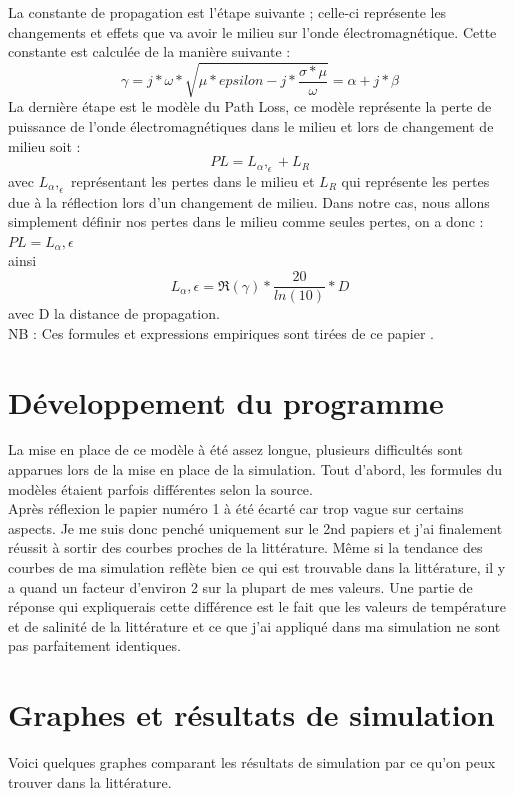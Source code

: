 \documentclass{article}
\begin{document}
La constante de propagation est l'étape suivante ; celle-ci représente les changements et effets que va avoir le milieu sur l'onde électromagnétique. Cette constante est calculée de la manière suivante :
\[\gamma = j*\omega*\sqrt{\mu*epsilon - j*\frac{\sigma*\mu}{\omega}} = \alpha + j* \beta\]
La dernière étape est le modèle du Path Loss, ce modèle représente la perte de puissance de l'onde électromagnétiques dans le milieu et lors de changement de milieu soit :
\[PL = L_\alpha,_\epsilon + L_R\]
avec \(L_\alpha,_\epsilon\) représentant les pertes dans le milieu et \(L_R\) qui représente les pertes due à la réflection lors d'un changement de milieu. Dans notre cas, nous allons simplement définir nos pertes dans le milieu comme seules pertes, on a donc :
\(PL = L_\alpha,\epsilon\)\\
ainsi
\[L_\alpha,\epsilon = \Re{(\gamma)} * \frac{20}{ln(10)} * D\]
avec D la distance de propagation.\\



NB : Ces formules et expressions empiriques sont tirées de ce papier \cite{reference_formules}.

\section{Développement du programme}
La mise en place de ce modèle à été assez longue, plusieurs difficultés sont apparues lors de la mise en place de la simulation. Tout d'abord, les formules du modèles étaient parfois différentes selon la source.\\
Après réflexion le papier numéro 1 à été écarté car trop vague sur certains aspects. Je me suis donc penché uniquement sur le 2nd papiers et j'ai finalement réussit à sortir des courbes proches de la littérature. Même si la tendance des courbes de ma simulation reflète bien ce qui est trouvable dans la littérature, il y a quand un facteur d'environ 2 sur la plupart de mes valeurs. Une partie de réponse qui expliquerais cette différence est le fait que les valeurs de température et de salinité de la littérature et ce que j'ai appliqué dans ma simulation ne sont pas parfaitement identiques.

\section{Graphes et résultats de simulation}
Voici quelques graphes comparant les résultats de simulation par ce qu'on peux trouver dans la littérature.
\end{document}
